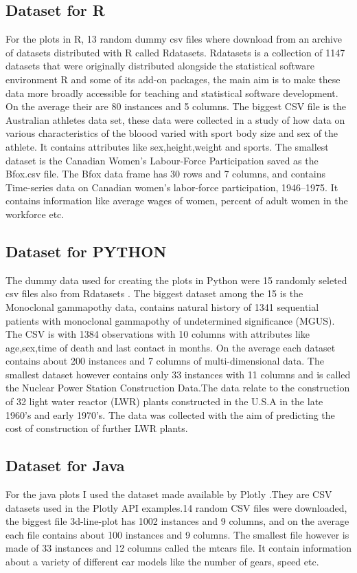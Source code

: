 \documentclass[12pt, a4paper,oneside]{report}
\begin{document}
\subsection{Dataset for R}
For the plots in R, 13 random dummy csv files where download from an archive of datasets distributed with R \cite{Franklin1999} called Rdatasets. Rdatasets is a collection of 1147 datasets that were originally distributed alongside the statistical software environment R and some of its add-on packages, the main aim is to make these data more broadly accessible for teaching and statistical software development. On the average their are 80 instances and 5 columns. The biggest CSV file is the Australian athletes data set, these data were collected in a study of how data on various characteristics of the bloood varied with sport body size and sex of the athlete. It contains attributes like sex,height,weight and sports. The smallest dataset is the Canadian Women's Labour-Force Participation saved as the Bfox.csv file. The Bfox data frame has 30 rows and 7 columns, and contains Time-series data on Canadian women's labor-force participation, 1946–1975. It contains information like average wages of women, percent of adult women in the workforce etc.


\subsection{Dataset for PYTHON}
The dummy data used for creating the plots in Python were 15 randomly seleted csv files also from  Rdatasets \cite{Franklin1999}. The biggest dataset among the 15 is the Monoclonal gammapothy data, contains natural history of 1341 sequential patients with monoclonal gammapothy of undetermined significance (MGUS). The CSV is with 1384 observations with 10 columns with attributes like age,sex,time of death and last contact in months. On the average each dataset contains about 200 instances and 7 columns of multi-dimensional data. The smallest dataset however contains only 33 instances with 11 columns and is called the Nuclear Power Station Construction Data.The data relate to the construction of 32 light water reactor (LWR) plants constructed in the U.S.A in the late 1960's and early 1970's. The data was collected with the aim of predicting the cost of construction of further LWR plants.

\subsection{Dataset for Java}
For the java plots I used the dataset made available by Plotly \cite{wid}.They are CSV datasets used in the Plotly API examples.14 random CSV files were downloaded, the biggest file 3d-line-plot has 1002 instances and 9 columns, and on the average each file contains about 100 instances and 9 columns. The smallest file however is made of 33 instances and 12 columns called the mtcars file. It contain information about a variety of different car models like the number of gears, speed etc. 
\end{document}
